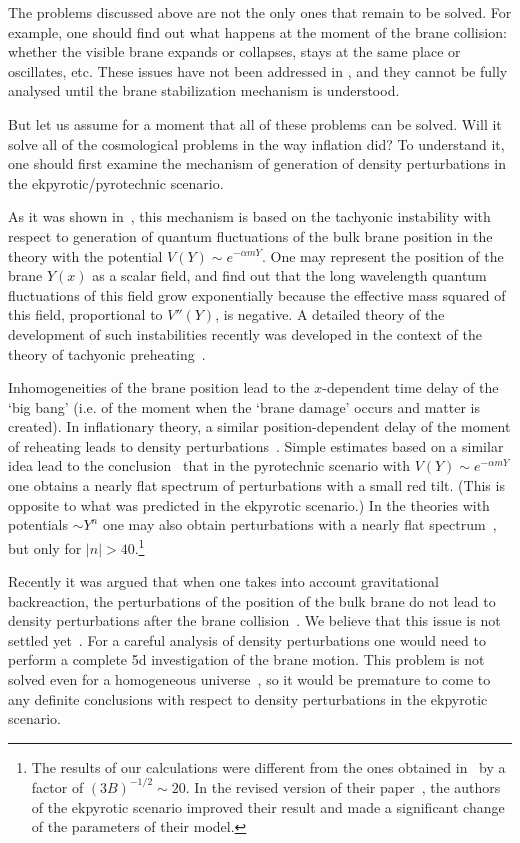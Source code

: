 \documentclass[a4paper,12pt]{article}
\begin{document}
The problems discussed above are not the only ones that remain to be solved. For example, one should find out what happens at the moment of the brane   
collision: whether the visible brane expands or collapses,  stays at the same   
place or oscillates, etc. These issues  have not been addressed in   
\cite{KOST}, and they cannot be fully analysed until the brane   
stabilization mechanism is understood.  

But let us assume for a moment that all of these problems can be solved. Will it solve all of the cosmological problems in the way inflation did? To understand it, one should first examine the mechanism of generation of density perturbations in the ekpyrotic/pyrotechnic scenario. 

As it was shown in~\cite{KKL}, this mechanism is based on the tachyonic instability with respect to generation of quantum fluctuations of the bulk brane position in the theory with the potential $V(Y) \sim e^{-\alpha m Y}$. One may represent the position of the brane $Y(x)$ as a scalar field, and find out that the long wavelength quantum fluctuations of this field grow exponentially because the effective mass squared of this field, proportional to $V''(Y)$, is negative.    A detailed theory of the development of such instabilities recently was developed in the context of the theory of tachyonic preheating~\cite{tach}.

Inhomogeneities of the brane position lead to the $x$-dependent time delay of the `big bang' (i.e. of the moment when the `brane damage' occurs and matter is created). In inflationary theory, a similar position-dependent delay of the moment of reheating leads to density perturbations~\cite{Mukh,Hawk,Mukh2}. Simple estimates based on a similar idea lead to the conclusion~\cite{KKL} that in the pyrotechnic scenario with $V(Y) \sim e^{-\alpha m Y}$ one obtains a nearly flat spectrum of perturbations with a small red tilt. (This is opposite to what was predicted in the ekpyrotic scenario.)  In the theories with potentials $\sim Y^n$ one may also obtain perturbations with a nearly flat spectrum~\cite{KKL}, but only for $|n| > 40$.\footnote{The results of our calculations were different from the ones obtained in~\cite{KOST} by a factor of $(3B)^{-1/2} \sim 20$. In the revised version of their paper~\cite{KOST}, the authors of the ekpyrotic scenario improved their result and made a significant change of the parameters of their model.}  

Recently it was argued that when one takes into account gravitational backreaction, the perturbations of the position of the bulk brane do not lead to density perturbations after the brane collision~\cite{Lyth:2001pf}. We believe that this issue is not settled yet~\cite{KKLT}. For a careful analysis of density perturbations one would need to perform a complete 5d investigation of the brane motion. This problem is not solved even for a homogeneous universe~\cite{KKLT}, so it would be premature to come to any definite conclusions with respect to density perturbations in the ekpyrotic scenario.
\end{document}
